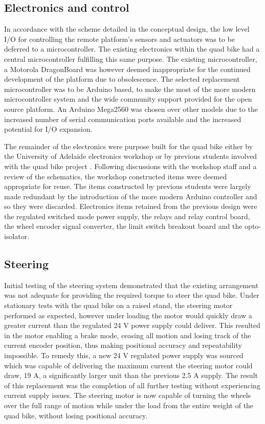 \documentclass[main.tex]{subfiles}
\begin{document}
\subsection{Electronics and control}
In accordance with the scheme detailed in the conceptual design, the low level I/O for controlling the remote platform's sensors and actuators was to be deferred to a microcontroller. The existing electronics within the quad bike had a central microcontroller fulfilling this same purpose. The existing microcontroller, a Motorola DragonBoard was however deemed inappropriate for the continued development of the platform due to obsolescence. The selected replacement microcontroller was to be Arduino based, to make the most of the more modern microcontroller system and the wide community support provided for the open source platform. An Arduino Mega2560 was chosen over other models due to the increased number of serial communication ports available and the increased potential for I/O expansion. 

The remainder of the electronics were purpose built for the quad bike either by the University of Adelaide electronics workshop or by previous students involved with the quad bike project \parencite{scheiner2011}. Following discussions with the workshop staff and a review of the schematics, the workshop constructed items were deemed appropriate for reuse. The items constructed by previous students were largely made redundant by the introduction of the more modern Arduino controller and so they were discarded. Electronics items retained from the previous design were the regulated switched mode power supply, the relays and relay control board, the wheel encoder signal converter, the limit switch breakout board and the opto-isolator. 


\subsection{Steering}
Initial testing of the steering system demonstrated that the existing arrangement was not adequate for providing the required torque to steer the quad bike. Under stationary tests with the quad bike on a raised stand, the steering motor performed as expected, however under loading the motor would quickly draw a greater current than the regulated 24 V power supply could deliver. This resulted in the motor enabling a brake mode, ceasing all motion and losing track of the current encoder position, thus making positional accuracy and repeatability impossible. To remedy this, a new 24 V regulated power supply was sourced which was capable of delivering the maximum current the steering motor could draw, 19 A, a significantly larger unit than the previous 2.5 A supply. The result of this replacement was the completion of all further testing without experiencing current supply issues. The steering motor is now capable of turning the wheels over the full range of motion while under the load from the entire weight of the quad bike, without losing positional accuracy.
\end{document}
